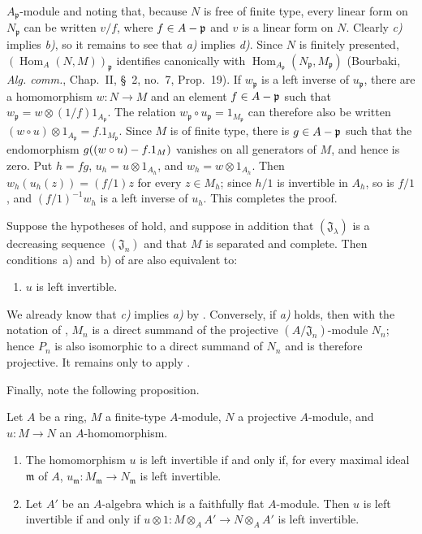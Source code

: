 $A_{\mathfrak p}$-module and noting that, because $N$ is free of finite type, every linear form on $N_{\mathfrak p}$ can be written $v/f$, where $f\in A-\mathfrak p$ and $v$ is a linear form on $N$.
Clearly \emph{c)} implies \emph{b)}, so it remains to see that \emph{a)} implies \emph{d)}.
Since $N$ is finitely presented, $(\operatorname{Hom}_A(N,M))_{\mathfrak p}$ identifies canonically with $\operatorname{Hom}_{A_{\mathfrak p}}(N_{\mathfrak p},M_{\mathfrak p})$ (Bourbaki, \emph{Alg. comm.}, Chap.~II, \S~2, no.~7, Prop.~19).
If $w_{\mathfrak p}$ is a left inverse of $u_{\mathfrak p}$, there are a homomorphism $w:N\to M$ and an element $f\in A-\mathfrak p$ such that $w_{\mathfrak p}=w\otimes(1/f)1_{A_{\mathfrak p}}$.
The relation $w_{\mathfrak p}\circ u_{\mathfrak p}=1_{M_{\mathfrak p}}$ can therefore also be written $(w\circ u)\otimes1_{A_{\mathfrak p}}=f.1_{M_{\mathfrak p}}$.
Since $M$ is of finite type, there is $g\in A-\mathfrak p$ such that the endomorphism $g((w\circ u)- f.1_M)$ vanishes on all generators of $M$, and hence is zero.
Put $h=fg$, $u_h=u\otimes1_{A_h}$, and $w_h=w\otimes1_{A_h}$.
Then $w_h(u_h(z))=(f/1)z$ for every $z\in M_h$;
since $h/1$ is invertible in $A_h$, so is $f/1$, and $(f/1)^{-1}w_h$ is a left inverse of $u_h$.
This completes the proof.

\begin{proposition}[19.1.13]
\label{0.19.1.13}
Suppose the hypotheses of  hold, and suppose in addition that $(\mathfrak J_\lambda)$ is a decreasing sequence $(\mathfrak J_n)$ and that $M$ is separated and complete.
Then conditions~\textup{a)} and~\textup{b)} of  are also equivalent to:
\begin{enumerate}
  \item[\textup{c)}] $u$ is left invertible.
\end{enumerate}
\end{proposition}

We already know that \emph{c)} implies \emph{a)} by .
Conversely, if \emph{a)} holds, then with the notation of , $M_n$ is a direct summand of the projective $(A/\mathfrak J_n)$-module $N_n$;
hence $P_n$ is also isomorphic to a direct summand of $N_n$ and is therefore projective.
It remains only to apply .

Finally, note the following proposition.

\begin{proposition}[19.1.14]
\label{0.19.1.14}
Let $A$ be a ring, $M$ a finite-type $A$-module, $N$ a projective $A$-module, and $u:M\to N$ an $A$-homomorphism.
\begin{enumerate}
  \item[\textup{(i)}] The homomorphism $u$ is left invertible if and only if, for every maximal ideal $\mathfrak m$ of $A$, $u_{\mathfrak m}:M_{\mathfrak m}\to N_{\mathfrak m}$ is left invertible.
  \item[\textup{(ii)}] Let $A'$ be an $A$-algebra which is a faithfully flat $A$-module.
  Then $u$ is left invertible if and only if $u\otimes1:M\otimes_AA'\to N\otimes_AA'$ is left invertible.
\end{enumerate}
\end{proposition}

